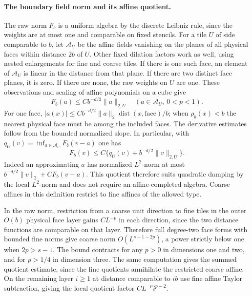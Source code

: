 \documentclass[11pt]{article}
\theoremstyle{definition}
\begin{document}
\paragraph{The boundary field norm and its affine quotient.}
The raw norm \(F_b\) is a uniform algebra by the discrete
Leibniz rule, since the weights are at most one and comparable
on fixed stencils. For a tile \(U\) of side comparable to \(b\),
let \(\mathcal A_U\) be the affine fields vanishing on the
planes of all physical faces within distance \(2b\) of \(U\).
Other fixed dilation factors work as well, using nested
enlargements for fine and coarse tiles. If there is one such
face, an element of \(\mathcal A_U\) is linear in the distance
from that plane. If there are two distinct face planes, it is
zero. If there are none, the raw weights on \(U\) are one.
These observations and scaling of affine polynomials on a
cube give
\begin{equation}
 F_b(a)\le Cb^{-d/2}\|a\|_{2,U}\quad (a\in\mathcal A_U,\ 0<p<1).
\end{equation}
For one face, \(|a(x)|\le Cb^{-d/2}\|a\|_2
\operatorname{dist}(x,\text{face})/b\); when \(\rho_b(x)<b\) the
nearest physical face must be among the included faces.
The derivative estimates follow from the bounded normalized
slope. In particular, with
\(q_U(v)=\inf_{a\in\mathcal A_U}F_b(v-a)\) one has
\begin{equation}
 F_b(v)\le C\{q_U(v)+b^{-d/2}\|v\|_{2,U}\}.
\end{equation}
Indeed an approximating \(a\) has normalized \(L^2\)-norm at
most \(b^{-d/2}\|v\|_2+C F_b(v-a)\). This quotient therefore
suits quadratic damping by the local \(L^2\)-norm and does not
require an affine-completed algebra. Coarse affines in this
definition restrict to fine affines of the allowed type.

In the raw norm, restriction from a coarse unit direction to
fine tiles in the outer \(O(b)\) physical face layer gains
\(C L^{-p}\) in each direction, since the two distance functions
are comparable on that layer. Therefore full degree-two face
forms with bounded fine norms give coarse norm
\(O(L^{s-1-2p})\), a power strictly below one when \(2p>s-1\).
The bound contracts for any \(p>0\) in dimensions one and two, and for \(p>1/4\) in dimension three.
The same computation gives the summed quotient estimate, since
the fine quotients annihilate the restricted coarse affine.
On the remaining layer \(i\ge1\) at distance comparable to
\(ib\) use fine affine Taylor subtraction, giving the local
quotient factor \(C L^{-p}i^{p-2}\).
\end{document}
